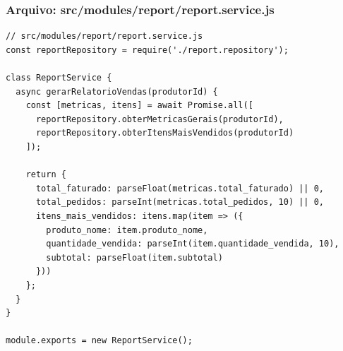 \subsubsection*{Arquivo: src/modules/report/report.service.js}
\begin{lstlisting}[caption={src/modules/report/report.service.js}]
// src/modules/report/report.service.js
const reportRepository = require('./report.repository');

class ReportService {
  async gerarRelatorioVendas(produtorId) {
    const [metricas, itens] = await Promise.all([
      reportRepository.obterMetricasGerais(produtorId),
      reportRepository.obterItensMaisVendidos(produtorId)
    ]);

    return {
      total_faturado: parseFloat(metricas.total_faturado) || 0,
      total_pedidos: parseInt(metricas.total_pedidos, 10) || 0,
      itens_mais_vendidos: itens.map(item => ({
        produto_nome: item.produto_nome,
        quantidade_vendida: parseInt(item.quantidade_vendida, 10),
        subtotal: parseFloat(item.subtotal)
      }))
    };
  }
}

module.exports = new ReportService();\end{lstlisting}
\vspace{0.5cm}

